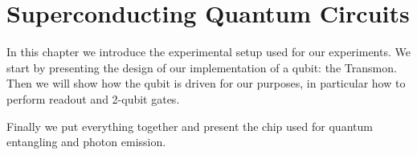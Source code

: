 \chapter{Superconducting Quantum Circuits}
\label{Chap:experimental}
\thispagestyle{fancy}

In this chapter we introduce the experimental setup used for our experiments.
We start by presenting the design of our implementation of a qubit: the Transmon.
Then we will show how the qubit is driven for our purposes, in particular how to perform readout and 2-qubit gates.

Finally we put everything together and present the chip used for quantum entangling and photon emission.


%
